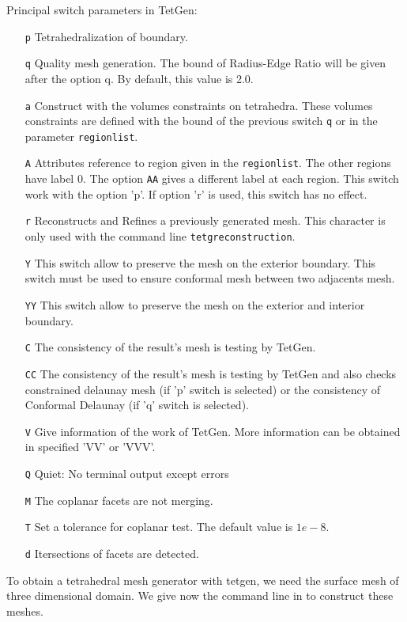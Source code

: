 \documentclass[a4paper,twoside,12pt]{book}
\begin{document}
Principal switch parameters in TetGen:
\begin{itemize}
\item [\texttt{p}] Tetrahedralization of boundary.
\item [\texttt{q}] Quality mesh generation. The bound of Radius-Edge Ratio will be given after the option q. By default, this value is 2.0.
\item [\texttt{a}] Construct with the volumes constraints on tetrahedra. These volumes constraints are defined with the bound of the previous
switch \texttt{q} or in the parameter \texttt{regionlist}.
\item [\texttt{A}] Attributes reference to region given in the \texttt{regionlist}. The other regions have label 0.
The option \texttt{AA} gives a different label at each region. This switch work with the option 'p'. If option 'r' is used, this switch has no effect.
\item [\texttt{r}] Reconstructs and Refines a previously generated mesh. This character is only used with the command line \texttt{tetgreconstruction}.
\item [\texttt{Y}] This switch allow to preserve the mesh on the exterior boundary.
This switch must be used to ensure conformal mesh between two adjacents mesh.
\item [\texttt{YY}] This switch allow to preserve the mesh on the exterior and interior boundary.
\item [\texttt{C}] The consistency of the result's mesh is testing by TetGen.
\item [\texttt{CC}] The consistency of the result's mesh is testing by TetGen and also checks constrained delaunay mesh
(if 'p' switch is selected) or the consistency of Conformal Delaunay (if 'q' switch is selected).
\item [\texttt{V}] Give information of the work of TetGen. More information can be obtained in specified 'VV' or 'VVV'.
\item [\texttt{Q}] Quiet: No terminal output except errors
\item [\texttt{M}] The coplanar facets are not merging.
\item [\texttt{T}] Set a tolerance for coplanar test. The default value is $1e-8$.
\item [\texttt{d}] Itersections of facets are detected.
\end{itemize}

To obtain a tetrahedral mesh generator with tetgen, we need the surface mesh of three dimensional domain.
We give now the command line in \freefempp to construct these meshes.
\end{document}
